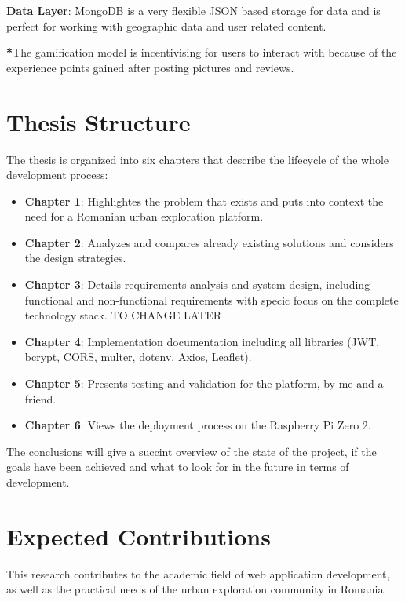 \documentclass[12pt,a4paper]{report}
\begin{document}
\textbf{Data Layer}: MongoDB is a very flexible JSON based storage for data and is perfect for working with geographic data and user related content.

\textbf{*}The gamification model is incentivising for users to interact with because of the experience points gained after posting pictures and reviews.

\section*{Thesis Structure}

The thesis is organized into six chapters that describe the lifecycle of the whole development process:

\begin{itemize}
    \item \textbf{Chapter 1}: Highlightes the problem that exists and puts into context the need for a Romanian urban exploration platform.
    
    \item \textbf{Chapter 2}: Analyzes and compares already existing solutions and considers the design strategies.
    
    \item \textbf{Chapter 3}: Details requirements analysis and system design, including functional
and non-functional requirements with specic focus on the complete technology
stack. TO CHANGE LATER
    
    \item \textbf{Chapter 4}: Implementation documentation including all libraries (JWT, bcrypt, CORS, multer, dotenv, Axios, Leaflet).
    
    \item \textbf{Chapter 5}: Presents testing and validation for the platform, by me and a friend.
    
    \item \textbf{Chapter 6}: Views the deployment process on the Raspberry Pi Zero 2.
\end{itemize}

The conclusions will give a succint overview of the state of the project, if the goals have been achieved and what to look for in the future in terms of development.

\section*{Expected Contributions}

This research contributes to the academic field of web application development, as well as the practical needs of the urban exploration community in Romania:
\end{document}
